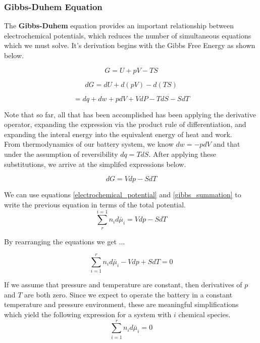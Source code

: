 \documentclass[lettersize,journal]{IEEEtran}
\begin{document}
\subsubsection{Gibbs-Duhem Equation}
The \textbf{Gibbs-Duhem} equation provides an important relationship between electrochemical potentials, which reduces the number of simultaneous equations which we must solve. It's derivation begins with the Gibbs Free Energy as shown below.

\begin{equation}
  G = U + pV - TS
\end{equation}

\begin{equation}
    dG = dU + d(pV) - d(TS)
\end{equation}

\begin{equation}
  = dq + dw + pdV + VdP -TdS - SdT
\end{equation}

\noindent Note that so far, all that has been accomplished has been applying the derivative operator, expanding the expression via the product rule of differentiation, and expanding the interal energy into the equivalent energy of heat and work.  \\

\noindent From thermodynamics of our battery system, we know $dw = -pdV$ and that under the assumption of reversibility $dq = TdS$. After applying these substitutions, we arrive at the simplifed expressions below.

\begin{equation}
  dG = Vdp - SdT
\end{equation}

We can use equations \ref{electrochemical_potential} and \ref{gibbs_summation} to write the previous equation in terms of the total potential.
\begin{equation}
  \sum_{r}^{i=1} n_id\bar{\mu}_i = Vdp - SdT
\end{equation}

\noindent By rearranging the equations we get ...

\begin{equation}
  \sum_{i=1}^{r} n_id\bar{\mu}_i - Vdp + SdT = 0
\end{equation}

\noindent If we assume that pressure and temperature are constant, then derivatives of $p$ and $T$ are both zero. Since we expect to operate the battery in a constant temperature and pressure environment, these are meaningful simplifications which yield the following expression for a system with $i$ chemical species.
\begin{equation}
  \sum_{i=1}^{r} n_id\bar{\mu}_i = 0
\end{equation}
\end{document}
